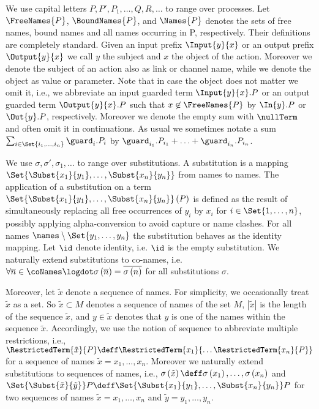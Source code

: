 \documentclass[]{llncs}
\begin{document}
We use capital letters $ P , P' , P_1, \ldots, Q, R, \ldots $ to range over processes. Let $ \FreeNames{P} $, $ \BoundNames{P} $, and $ \Names{P} $ denotes the sets of free names, bound names and all names occurring in P, respectively. Their definitions are completely standard. Given an input prefix $ \Input{y}{x} $ or an output prefix $ \Output{y}{x} $ we call $ y $ the subject and $ x $ the object of the action. Moreover we denote the subject of an action also as link or channel name, while we denote the object as value or parameter. Note that in case the object does not matter we omit it, i.e., we abbreviate an input guarded term $ \Input{y}{x}.P $ or an output guarded term $ \Output{y}{x}.P $ such that $ x \not \in \FreeNames{P} $ by $ \In{y}.P $ or $ \Out{y}.P $, respectively. Moreover we denote the empty sum with $ \nullTerm $ and often omit it in continuations. As usual we sometimes notate a sum $ \sum_{i \in \Set{ i_1, \ldots, i_n }} \guard_i.P_i $ by $ \guard_{i_1}.P_{i_1} + \ldots + \guard_{i_n}.P_{i_n} $.

We use $ \sigma, \sigma', \sigma_1, \ldots $ to range over substitutions. A substitution is a mapping $ \Set{ \Subst{x_1}{y_1}, \ldots, \Subst{x_n}{y_n} } $ from names to names. The application of a substitution on a term $ \Set{ \Subst{x_1}{y_1}, \ldots, \Subst{x_n}{y_n} }\left( P \right) $ is defined as the result of simultaneously replacing all free occurrences of $ y_i $ by $ x_i $ for $ i \in \Set{ 1, \ldots, n } $, possibly applying alpha-conversion to avoid capture or name clashes. For all names $ \names \setminus \Set{ y_1, \ldots, y_n } $ the substitution behaves as the identity mapping. Let $ \id $ denote identity, i.e. $ \id $ is the empty substitution. We naturally extend substitutions to co-names, i.e. $ \forall \overline{n} \in \coNames \logdot \sigma\left( \overline{n} \right) = \overline{\sigma\left( n \right)} $ for all substitutions $ \sigma $.

Moreover, let $ \tilde{x} $ denote a sequence of names. For simplicity, we occasionally treat $ \tilde{x} $ as a set. So $ \tilde{x} \subset M $ denotes a sequence of names of the set $ M $, $ |\tilde{x}| $ is the length of the sequence $ \tilde{x} $, and $ y \in \tilde{x} $ denotes that $ y $ is one of the names within the sequence $ \tilde{x} $. Accordingly, we use the notion of sequence to abbreviate multiple restrictions, i.e., $ \RestrictedTerm{\tilde{x}}{P} \deff \RestrictedTerm{x_1}{\ldots \RestrictedTerm{x_n}{P}} $ for a sequence of names $ \tilde{x} = x_1, \ldots, x_n $. Moreover we naturally extend substitutions to sequences of names, i.e., $ \sigma\left( \tilde{x} \right) \deff \sigma\left( x_1 \right), \ldots, \sigma\left( x_n \right) $ and $ \Set{ \Subst{\tilde{x}}{\tilde{y}} }P \deff \Set{ \Subst{x_1}{y_1}, \ldots, \Subst{x_n}{y_n} }P $ for two sequences of names $ \tilde{x} = x_1, \ldots, x_n $ and $ \tilde{y} = y_1, \ldots, y_n $.
\end{document}
